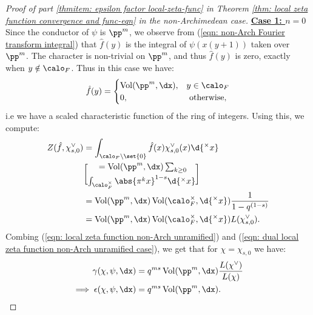 \documentclass[11pt, x11names, openany]{book}
\begin{document}
\begin{proof}[Proof of part \ref{thmitem: epsilon factor local-zeta-func} in Theorem \ref{thm: local zeta function convergence and func-eqn} in the non-Archimedean case]
\underline{\textbf{Case 1: $n=0$}}\\
Since the conductor of $\psi$ is $\pp^m$, we observe from (\ref{eqn: non-Arch Fourier transform integral}) that $\hat{f}(y)$ is the integral of $\psi(x(y+1))$ taken over $\pp^m$. The character is non-trivial on $\pp^m$, and thus $\hat{f}(y)$ is zero, exactly when $y \notin \calo_F$. Thus in this case we have:
\begin{equation*}
    \hat{f}(y) = \begin{cases}
    \vol(\pp^m, \dx), & y \in \calo_F\\
    0, & \text{ otherwise},
    \end{cases}
\end{equation*}
i.e we have a scaled characteristic function of the ring of integers. Using this, we compute:
\begin{align}
\label{eqn: dual local zeta function non-Arch unramified case}
    Z(\hat{f}, \chi^\lor_{s, 0}) &= \int_{\calo_F \setminus \set{0}} \hat{f}(x) \chi^\lor_{s, 0}(x) \d{^\times x} \nonumber \\
    &= \vol(\pp^m, \dx) \sum_{k \geq 0} \brack{\int_{\calo_F^\times} \abs{\pi^k x}^{1-s} \d{^\times x}} \nonumber \\
    &= \vol(\pp^m, \dx) \vol(\calo_F^\times, \d{^\times x}) \frac{1}{1 - q^{(1-s)}} \nonumber \\
    &= \vol(\pp^m, \dx) \vol(\calo_F^\times, \d{^\times x}) L(\chi^\lor_{s, 0}).
\end{align}
Combing (\ref{eqn: local zeta function non-Arch unramified}) and (\ref{eqn: dual local zeta function non-Arch unramified case}), we get that for $\chi = \chi_{s, 0}$ we have:
\begin{align}
\label{eqn: local epsilon factor non-Arch unramified}
    \gamma(\chi, \psi, \dx) &= q^{ms} \vol(\pp^m, \dx) \frac{L(\chi^\lor)}{L(\chi)} \nonumber \\
    \implies \epsilon(\chi, \psi, \dx) &= q^{ms}\vol(\pp^m, \dx).
\end{align}


\end{proof}
\end{document}
